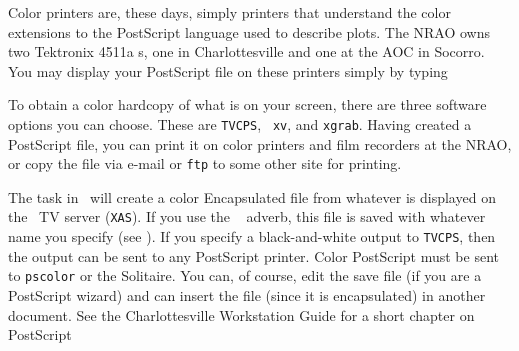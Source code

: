      Color printers are, these days, simply printers that understand
the color extensions to the PostScript language used to describe
plots.  The NRAO owns two Tektronix 4511a s, one
in Charlottesville and one at the AOC in Socorro.  You may display
your PostScript file on these printers simply by typing


     To obtain a color hardcopy of what is on your screen, there are
three software options you can choose.  These are {\tt TVCPS}, {\tt
xv}, and {\tt xgrab}.  Having created a PostScript file, you can print
it on color printers and film recorders at the NRAO, or copy the file
via e-mail or {\tt ftp} to some other site for printing.

     The {\tt {}} task in \AIPS\ will create a color
Encapsulated  file from whatever is displayed on the
\AIPS\ TV server (\hbox{{\tt XAS}}).  If you use the {\tt
{}} adverb, this file is saved with whatever name you
specify (see ).  If you specify a black-and-white output to
{\tt TVCPS}, then the output can be sent to any PostScript printer.
Color PostScript must be sent to {\tt pscolor} or the Solitaire.  You
can, of course, edit the save file (if you are a PostScript wizard)
and can insert the file (since it is encapsulated) in another
document.  See the Charlottesville Workstation Guide for a short
chapter on PostScript

